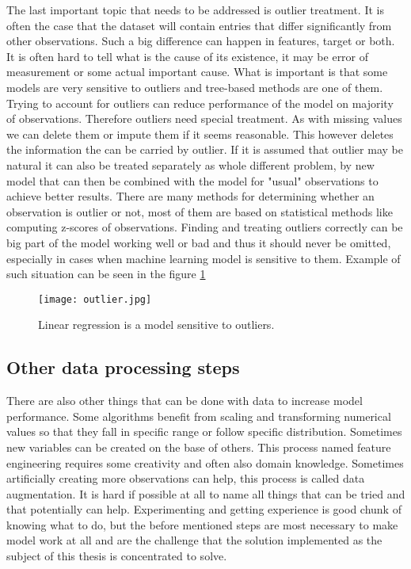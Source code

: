 \documentclass[a4paper,twoside,12pt]{book}
\newcommand*\setcaptioncitation[1]{\def\captioncitation{\textit{Source:}~#1}}
\let\captioncitation\relax
\begin{document}
The last important topic that needs to be addressed is outlier treatment. It is often the case that the dataset will contain entries that differ significantly from other observations. Such a big difference can happen in features, target or both. It is often hard to tell what is the cause of its existence, it may be error of measurement or some actual important cause. What is important is that some models are very sensitive to outliers and tree-based methods are one of them. Trying to account for outliers can reduce performance of the model on majority of observations. Therefore outliers need special treatment.
As with missing values we can delete them or impute them if it seems reasonable. This however deletes the information the can be carried by outlier. If it is assumed that outlier may be natural it can also be treated separately as whole different problem, by new model that can then be combined with the model for "usual" observations to achieve better results.
There are many methods for determining whether an observation is outlier or not, most of them are based on statistical methods like computing z-scores of observations. 
Finding and treating outliers correctly can be big part of the model working well or bad and thus it should never be omitted, especially in cases when machine learning model is sensitive to them. Example of such situation can be seen in the figure \ref{fig:outlier}

\begin{figure}[ht]
    \centering
    \texttt{[image: outlier.jpg]}
    \setcaptioncitation{\url{https://cutt.ly/njfIUKa}}
    \caption{Linear regression is a model sensitive to outliers.}
    \label{fig:outlier}
\end{figure}





\subsection{Other data processing steps}

There are also other things that can be done with data to increase model performance. Some algorithms benefit from scaling and transforming numerical values so that they fall in specific range or follow specific distribution. Sometimes new variables can be created on the base of others. This process named feature engineering requires some creativity and often also domain knowledge. Sometimes artificially creating more observations can help, this process is called data augmentation. It is hard if possible at all to name all things that can be tried and that potentially can help. Experimenting and getting experience is good chunk of knowing what to do, but the before mentioned steps are most necessary to make model work at all and are the challenge that the solution implemented as the subject of this thesis is concentrated to solve.
\end{document}
